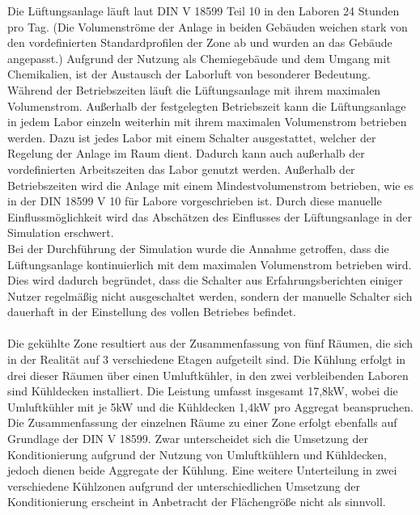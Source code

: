 Die Lüftungsanlage läuft laut DIN V 18599 Teil 10 in den Laboren 24 Stunden pro Tag. (Die Volumenströme der Anlage in beiden Gebäuden weichen stark von den vordefinierten Standardprofilen der Zone ab und wurden an das Gebäude angepasst.) Aufgrund der Nutzung als Chemiegebäude und dem Umgang mit Chemikalien, ist der Austausch der Laborluft von besonderer Bedeutung. Während der Betriebszeiten läuft die Lüftungsanlage mit ihrem maximalen Volumenstrom. Außerhalb der festgelegten Betriebszeit kann die Lüftungsanlage in jedem Labor einzeln weiterhin mit ihrem maximalen Volumenstrom betrieben werden. Dazu ist jedes Labor mit einem Schalter ausgestattet, welcher der Regelung der Anlage im Raum dient. Dadurch kann auch außerhalb der vordefinierten Arbeitszeiten das Labor genutzt werden. Außerhalb der Betriebszeiten wird die Anlage mit einem Mindestvolumenstrom betrieben, wie es in der DIN 18599 V 10 für Labore vorgeschrieben ist. Durch diese manuelle Einflussmöglichkeit wird das Abschätzen des Einflusses der Lüftungsanlage in der Simulation erschwert.  \\
Bei der Durchführung der Simulation wurde die Annahme getroffen, dass die Lüftungsanlage kontinuierlich mit dem maximalen Volumenstrom betrieben wird. Dies wird dadurch begründet, dass die Schalter aus Erfahrungsberichten einiger Nutzer regelmäßig nicht ausgeschaltet werden, sondern der manuelle Schalter sich dauerhaft in der Einstellung des vollen Betriebes befindet. \\
\\
Die gekühlte Zone resultiert aus der Zusammenfassung von fünf Räumen, die sich in der Realität auf 3 verschiedene Etagen aufgeteilt sind. Die Kühlung erfolgt in drei dieser Räumen über einen Umluftkühler, in den zwei verbleibenden Laboren sind Kühldecken installiert. Die Leistung umfasst insgesamt 17,8kW, wobei die Umluftkühler mit je 5kW und die Kühldecken 1,4kW pro Aggregat beanspruchen. Die Zusammenfassung der einzelnen Räume zu einer Zone erfolgt ebenfalls auf Grundlage der DIN V 18599. 
Zwar unterscheidet sich die Umsetzung der Konditionierung aufgrund der Nutzung von Umluftkühlern und Kühldecken, jedoch dienen beide Aggregate der Kühlung. Eine weitere Unterteilung in zwei verschiedene Kühlzonen aufgrund der unterschiedlichen Umsetzung der Konditionierung erscheint in Anbetracht der Flächengröße nicht als sinnvoll.\\
\\

